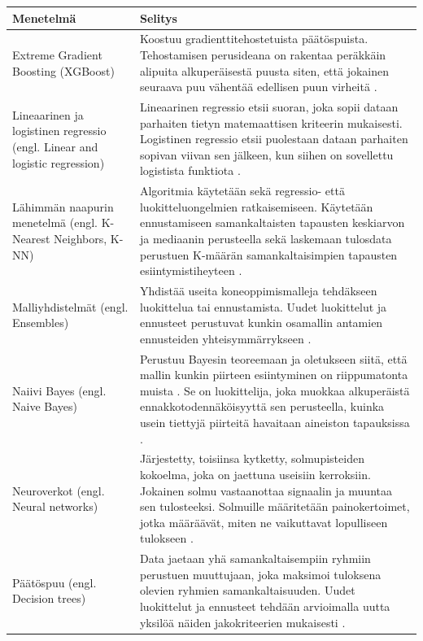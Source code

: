 \documentclass[utf8, bachelor]{gradu3}
\begin{document}
\begin{longtable}{| p{} | p{} |}
\hline
\textbf{Menetelmä} & \textbf{Selitys} \\ \hline
Extreme Gradient Boosting (XGBoost) & Koostuu gradienttitehostetuista päätöspuista. Tehostamisen perusideana on rakentaa peräkkäin alipuita alkuperäisestä puusta siten, että jokainen seuraava puu vähentää edellisen puun virheitä \parencite{8906396}. \\ \hline
Lineaarinen ja logistinen regressio (engl. Linear and logistic regression) & Lineaarinen regressio etsii suoran, joka sopii dataan parhaiten tietyn matemaattisen kriteerin mukaisesti. Logistinen regressio etsii puolestaan dataan parhaiten sopivan viivan sen jälkeen, kun siihen on sovellettu logistista funktiota \parencite{black_introduction_2023}. \\ \hline
Lähimmän naapurin menetelmä (engl. K-Nearest Neighbors, K-NN) & Algoritmia käytetään sekä regressio- että luokitteluongelmien ratkaisemiseen. Käytetään ennustamiseen samankaltaisten tapausten keskiarvon ja mediaanin perusteella sekä laskemaan tulosdata perustuen K-määrän samankaltaisimpien tapausten esiintymistiheyteen \parencite{singh_machine_2021}. \\ \hline
Malliyhdistelmät (engl. Ensembles) & Yhdistää useita koneoppimismalleja tehdäkseen luokittelua tai ennustamista. Uudet luokittelut ja ennusteet perustuvat kunkin osamallin antamien ennusteiden yhteisymmärrykseen \parencite{black_introduction_2023}. \\ \hline
Naiivi Bayes (engl. Naive Bayes) & Perustuu Bayesin teoreemaan ja oletukseen siitä, että mallin kunkin piirteen esiintyminen on riippumatonta muista \parencite{singh_machine_2021}. Se on luokittelija, joka muokkaa alkuperäistä ennakkotodennäköisyyttä sen perusteella, kuinka usein tiettyjä piirteitä havaitaan aineiston tapauksissa \parencite{black_introduction_2023}.\\ \hline
Neuroverkot (engl. Neural networks) & Järjestetty, toisiinsa kytketty, solmupisteiden kokoelma, joka on jaettuna useisiin kerroksiin. Jokainen solmu vastaanottaa signaalin ja muuntaa sen tulosteeksi. Solmuille määritetään painokertoimet, jotka määräävät, miten ne vaikuttavat lopulliseen tulokseen \parencite{black_introduction_2023}. \\ \hline
Päätöspuu (engl. Decision trees) & Data jaetaan yhä samankaltaisempiin ryhmiin perustuen muuttujaan, joka maksimoi tuloksena olevien ryhmien samankaltaisuuden. Uudet luokittelut ja ennusteet tehdään arvioimalla uutta yksilöä näiden jakokriteerien mukaisesti \parencite{black_introduction_2023}.\\ \hline

\end{longtable}
\end{document}
